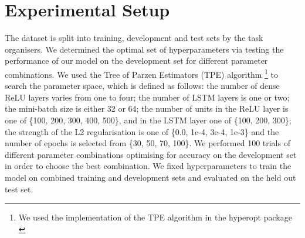 \documentclass[11pt,a4paper]{article}
\begin{document}
\section{Experimental Setup}
The dataset is split into training, development and test sets by the task organisers.
 We determined the optimal set of hyperparameters via testing the performance of our model on the development set for different parameter combinations. We used the Tree of Parzen Estimators (TPE) algorithm \footnote{We used the implementation of the TPE algorithm in the hyperopt package \cite{bergstra2013making}} to search the parameter space, which is defined as follows: the number of dense ReLU layers varies from one to four; the number of LSTM layers is one or two; the mini-batch size is either 32 or 64; the number of units in the ReLU layer is one of \{100, 200, 300, 400, 500\}, and in the LSTM layer one of \{100, 200, 300\}; the strength of the L2 regularisation is one of \{0.0, 1e-4, 3e-4, 1e-3\} and the number of epochs is selected from \{30, 50, 70, 100\}. We performed 100 trials of different parameter combinations optimising for accuracy on the development set in order to choose the best combination.  We fixed hyperparameters to train the model on combined training and development sets and evaluated on the held out test set.
\end{document}
